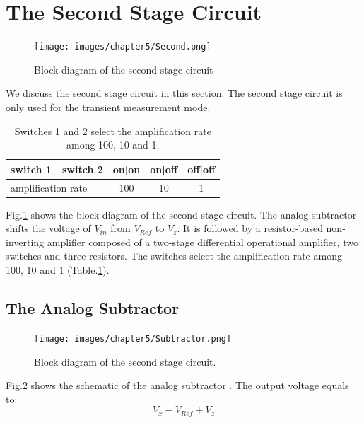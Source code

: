 {\FloatBarrier
\section{The Second Stage Circuit}
\FloatBarrier
\begin{figure}[!h]
    \centering
    \texttt{[image: images/chapter5/Second.png]}
    \caption{Block diagram of the second stage circuit}
    \label{fig:secondStage}
\end{figure}

We discuss the second stage circuit in this section.
The second stage circuit is only used for the transient measurement mode.



\begin{table}[!b]
    {\fontfamily{}\fontsize{10}{14}\selectfont
    \centering
    \begin{tabular}{l||c||c||c}
        switch 1 | switch 2 & on|on & on|off & off|off \\
        \hline
        amplification rate  & 100   & 10     & 1 \\
    \end{tabular}
    \caption{Switches 1 and 2 select the amplification rate among 100, 10 and 1.}
    \label{tb:AmpRate}
    }
\end{table}
Fig.\ref{fig:secondStage} shows the block diagram of the second stage circuit.
The analog subtractor shifts the voltage of $V_{in}$ from $V_{Ref}$ to $V_z$.
It is followed by a resistor-based non-inverting amplifier composed of a two-stage differential operational amplifier, two switches and three resistors.
The switches select the amplification rate among 100, 10 and 1 (Table.\ref{tb:AmpRate}).

\subsection{The Analog Subtractor} \label{sec:sub}

\begin{figure}[!htbp]
    \centering
        \texttt{[image: images/chapter5/Subtractor.png]}
    \caption{Block diagram of the second stage circuit.}
    \label{fig:subtractor}
\end{figure}

Fig.\ref{fig:subtractor} shows the schematic of the analog subtractor \cite{Tsubtractor}.
The output voltage equals to:
\begin{equation}
    V_x - V_{Ref} + V_z
\end{equation}

}
